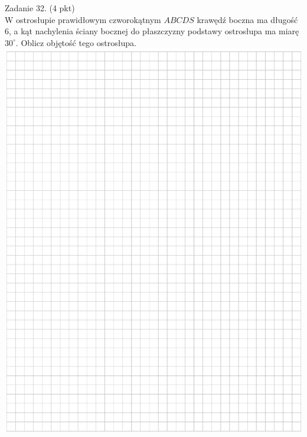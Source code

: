 \documentclass[10pt]{article}
\begin{document}
Zadanie 32. (4 pkt)\\
W ostrosłupie prawidłowym czworokątnym \(A B C D S\) krawędź boczna ma długość 6, a kąt nachylenia ściany bocznej do płaszczyzny podstawy ostrosłupa ma miarę \(30^{\circ}\). Oblicz objętość tego ostrosłupa.\\
\includegraphics[max width=\textwidth, center]{2024_11_21_8e981e1ab2c7e641f462g-13}
\end{document}
